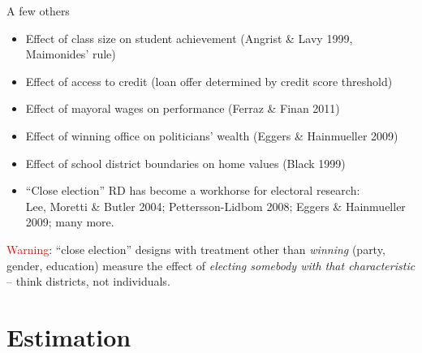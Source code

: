 \documentclass[xcolor=dvipsnames]{beamer}
\begin{document}
\begin{frame}{A few others}
\small
\begin{itemize}
\item Effect of class size on student achievement (Angrist \& Lavy 1999, Maimonides' rule)
\item Effect of access to credit (loan offer determined by credit score threshold)
\item Effect of mayoral wages on performance (Ferraz \& Finan 2011)
\item Effect of winning office on politicians' wealth (Eggers \& Hainmueller 2009)
\item Effect of school district boundaries on home values (Black 1999)
\item ``Close election'' RD has become a workhorse for electoral research: \\
  {\footnotesize Lee, Moretti \& Butler 2004; Pettersson-Lidbom 2008; Eggers \& Hainmueller 2009; many more.}
\end{itemize}
\medskip
{} \textcolor{Red}{Warning}: ``close election'' designs with treatment other than \textit{winning} (party, gender, education) measure the effect of \textit{electing somebody with that characteristic} -- think districts, not individuals.
\end{frame}


\section{Estimation}
\end{document}
